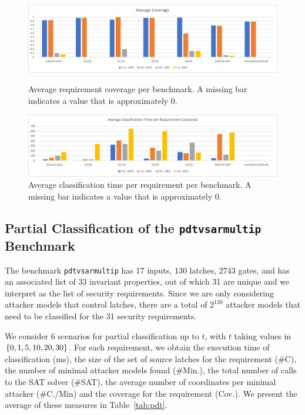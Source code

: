 {\begin{figure}[!t]
\centering
\includegraphics[width=\textwidth]{AverageCoverage}
\caption{Average requirement coverage per benchmark. A missing bar indicates a value that is approximately 0.}
\label{fig:AverageCoverage}
\vspace{0.5cm}
\includegraphics[width=\textwidth]{AverageExecutionTime}
\caption{Average classification time per requirement per benchmark. A missing bar indicates a value that is approximately 0. }
\label{fig:AverageExecTime}
\end{figure}

\subsection{Partial Classification of the \texttt{pdtvsarmultip} Benchmark}
The benchmark \texttt{pdtvsarmultip} has 17 inputs, %
130 latches, %
2743 gates, %
and has an associated list of 33 invariant properties, out of which 31 are unique and we interpret as the list of security requirements. 
Since we are only considering attacker models that control latches, there are a total of $2^{130}$ attacker models that need to be classified for the 31 security requirements.

We consider 6 scenarios for partial classification up to $t$, with $t$ taking values in $\left\{0,1,5,10,20,30\right\}$. For each requirement, we obtain the execution time of classification (ms), the size of the set of source latches for the requirement (\#C), the number of minimal attacker models found (\#Min.), the total number of calls to the SAT solver (\#SAT), the average number of coordinates per minimal attacker (\#C./Min) and the coverage for the requirement (Cov.). We present the average of these measures in Table~\ref{tab:pdt}. 

}
